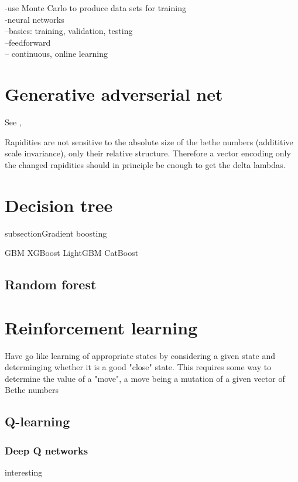 \documentclass[11pt, a4paper]{report} %
\begin{document}
-use Monte Carlo to produce data sets for training\\
-neural networks\\
--basics: training, validation, testing\\
--feedforward\\
-- continuous, online learning


\section{Generative adverserial net}
See \cite{Liu2017}, \cite{Kratzwald2017}

Rapidities are not sensitive to the absolute size of the bethe numbers (addititive scale invariance), only their relative structure.
Therefore a vector encoding only the changed rapidities should in principle be enough to get the delta lambdas.

\section{Decision tree}

subsection{Gradient boosting}

GBM
XGBoost
LightGBM
CatBoost

\subsection{Random forest}

\section{Reinforcement learning}
Have go like learning of appropriate states by considering a given state and determinging whether it is a good "close" state.
This requires some way to determine the value of a "move", a move being a mutation of a given vector of Bethe numbers\cite{Silver2017}

\subsection{Q-learning}

\subsubsection{Deep Q networks}

interesting\cite{mnih13_playin_atari_with_deep_reinf_learn,lillicrap15_contin_contr_with_deep_reinf_learn}
\end{document}
